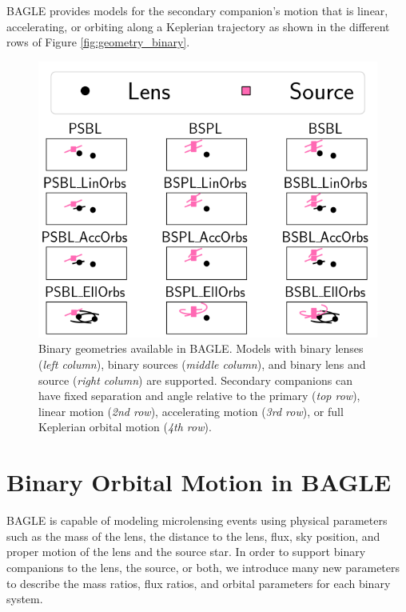 \documentclass[twocolumn]{aastex701}
\begin{document}
BAGLE provides models for the secondary companion's motion that is linear, accelerating, or orbiting along a Keplerian trajectory as shown in the different rows of Figure \ref{fig:geometry_binary}. 

\begin{figure}
    \centering
    \includegraphics[width= .5 \textwidth]{figures/geometry_schematic_binary_familes.png}
    \caption{Binary geometries available in BAGLE. Models with binary lenses ({\em left column}), binary sources ({\em middle column}), and binary lens and source ({\em right column}) are supported. Secondary companions can have fixed separation and angle relative to the primary ({\em top row}), linear motion ({\em 2nd row}), accelerating motion ({\em 3rd row}), or full Keplerian orbital motion ({\em 4th row}).}
    \label{fig:lens_source_models}
\end{figure}



\section{Binary Orbital Motion in BAGLE \label{sec:binary_solutions}}

BAGLE is capable of modeling microlensing events using physical parameters such as the mass of the lens, the distance to the lens, flux, sky position, and proper motion of the lens and the source star. In order to support binary companions to the lens, the source, or both, we introduce many new parameters to describe the mass ratios, flux ratios, and orbital parameters for each binary system. 
\end{document}
